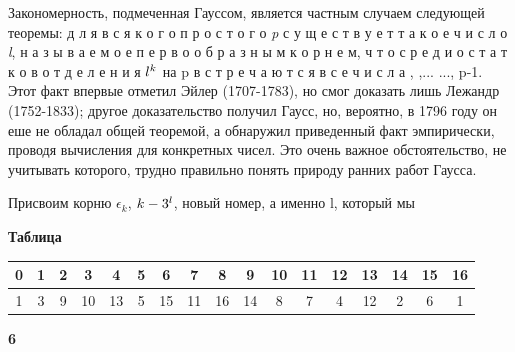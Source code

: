 \begin{multicols}{2}
    Закономерность, \qquad подмеченная Гауссом, является частным случаем следующей теоремы: д л я в с я к о г о \quad п р о с т о г о \qquad \textit{p} \quad с у щ е с т в у е т \quad т а к о е \quad ч и с л о \quad \textit{l}, \quad н а з ы в а е м о е \quad п е р в о о б р а з н ы м \quad к о р н е м, \quad ч т о \quad с р е д и \quad о с т а т к о в \quad о т \quad д е л е н и я \quad $l\sp{k}$ \quad на p \quad в с т р е ч а ю т с я \quad в с е \quad ч и с л а , ,\quad ...
    ..., p-1. Этот факт впервые отметил Эйлер (1707-1783), но смог доказать лишь Лежандр (1752-1833); другое доказательство получил Гаусс, но, вероятно, в 1796 году он еше не обладал общей теоремой, а обнаружил приведенный факт эмпирически, проводя вычисления для конкретных чисел. Это очень важное обстоятельство, не учитывать которого, трудно правильно понять природу ранних работ Гаусса.\par
    Присвоим корню $\epsilon_k$, $k-3\sp{l}$, новый номер, а именно l, который мы 
\end{multicols}
\begin{flushleft}
    \textbf{Таблица}
\end{flushleft}
\begin{center}
    \begin{tabular}{|c|c|c|c|c|c|c|c|c|c|c|c|c|c|c|c|c|}
    \hline
        0 & 1 & 2& 3 & 4 & 5 & 6 & 7 & 8 & 9 & 10 & 11 & 12 & 13 & 14 & 15 & 16 \\
        \hline
        1 & 3 & 9 & 10 & 13 & 5 & 15 & 11 & 16 & 14 & 8 & 7 & 4 & 12 & 2 & 6 & 1\\
    \hline
    \end{tabular}
\end{center}
{\small\textbf{6}}
